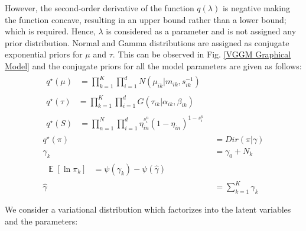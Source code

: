 \documentclass[letterpaper]{article}
\begin{document}
However, the second-order derivative of the function $q(\lambda)$ is negative making the function concave, resulting in an upper bound rather than a lower bound; which is required. 
Hence, $\lambda$ is considered as a parameter and is not assigned any prior distribution\cite{b5}. 
Normal and Gamma distributions are assigned as conjugate exponential priors for $\mu$ and $\tau$. This can be observed in Fig. \ref{VGGM Graphical Model} and the conjugate priors for all the model parameters are given as follows:
\begin{align}
        \label{mu}
        \begin{split}
            q^\star(\mu) &= \prod_{k=1}^K\prod_{i=1}^d N(\mu_{ik}| m_{ik}, s_{ik}^{-1})   
        \end{split}\\
    \label{tau}
        \begin{split}
            q^\star(\tau) &= \prod_{k=1}^K\prod_{i=1}^d G(\tau_{ik}|\alpha_{ik}, \beta_{ik})    
        \end{split}
    \\
    \label{S}
        \begin{split}
            q^\star(S) &= \prod_{n=1}^N\prod_{i=1}^d \eta_{in}^{s_i^n}(1-\eta_{in})^{1-s_i^n}
        \end{split}
    \\
    \label{pi}
        q^\star(\pi) &=  Dir(\pi|\gamma)
    \\
    \label{gammak}
        \gamma_k &= \gamma_0 + N_k
    \\
    \label{exppi}    
    \begin{split}
        \mathop{\mathbb{E}}[\ln \pi_k] &= \psi(\gamma_k) - \psi(\hat{\gamma})
    \end{split}\\
    \label{gammak}
    \hat{\gamma} &= \sum_{k=1}^{K} \gamma_k
\end{align}
        
    

We consider a variational distribution which factorizes into the latent
variables and the parameters:
\end{document}
